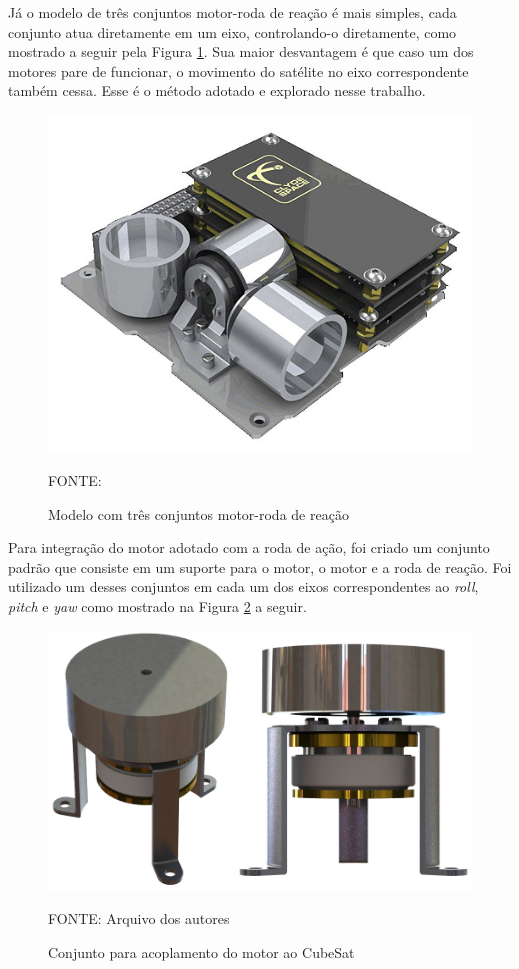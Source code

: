 \documentclass[
	12pt,				%
	openany,			%
	twoside,			%
	a4paper,			%
	english,			%
	french,				%
	spanish,			%
	brazil,				%
	oldfontcommands
	]{abntex2}
\begin{document}
Já o modelo de três conjuntos motor-roda de reação é mais simples, cada conjunto atua diretamente em um eixo, controlando-o diretamente, como mostrado a seguir pela Figura \ref{fig:3RW}. Sua maior desvantagem é que caso um dos motores pare de funcionar, o movimento do satélite no eixo correspondente também cessa. Esse é o método adotado e explorado nesse trabalho.

\begin{figure}[th]
	\caption{Modelo com três conjuntos motor-roda de reação}
	\centering
	\includegraphics[width=0.7\linewidth]{./figs/3RW}
	
	\begin{small}
		FONTE: \cite{3RW}
	\end{small}
	\label{fig:3RW}
\end{figure}

\newpage

Para integração do motor adotado com a roda de ação, foi criado um conjunto padrão que consiste em um suporte para o motor, o motor e a roda de reação. Foi utilizado um desses conjuntos em cada um dos eixos correspondentes ao \textit{roll}, \textit{pitch} e \textit{yaw} como mostrado na Figura \ref{fig:MotSet} a seguir.

\begin{figure}[th]
	\caption{Conjunto para acoplamento do motor ao CubeSat}
	\centering
	\includegraphics[width=0.69\linewidth]{./figs/Motor_Set}
	
	\begin{small}
		FONTE: Arquivo dos autores
	\end{small}
	\label{fig:MotSet}
\end{figure}
\end{document}
